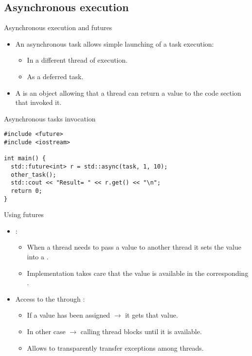 \subsection{Asynchronous execution}

\begin{frame}[t]{Asynchronous execution and futures}
\begin{itemize}
  \item An asynchronous task allows simple launching of a task execution:
    \begin{itemize}
      \item In a different thread of execution.
      \item As a deferred task.
    \end{itemize}
  
  \item A  
        is an object allowing that a thread can return a value
        to the code section that invoked it.
\end{itemize}
\end{frame}

\begin{frame}[t,fragile]
\begin{block}{Asynchronous tasks invocation}
\begin{lstlisting}
#include <future>
#include <iostream>

int main() {
  std::future<int> r = std::async(task, 1, 10);
  other_task();
  std::cout << "Result= " << r.get() << "\n";
  return 0;
}
\end{lstlisting}
\end{block}
\end{frame}

\begin{frame}[t]{Using futures}
\begin{itemize}
  \item {}:
    \begin{itemize}
      \item When a thread needs to pass a value to another thread it sets the value into a .
      \item Implementation takes care that the value is available in the corresponding .
    \end{itemize}

  \item Access to the  through :
    \begin{itemize}
      \item If a value has been assigned $\rightarrow$ it gets that value.
      \item In other case $\rightarrow$ calling thread blocks until it is available.
      \item Allows to transparently transfer exceptions among threads.
    \end{itemize}
\end{itemize}
\end{frame}
